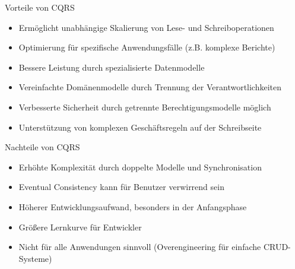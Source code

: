 \begin{concept}{Vorteile von CQRS}\\
    \begin{itemize}
        \item Ermöglicht unabhängige Skalierung von Lese- und Schreiboperationen
        \item Optimierung für spezifische Anwendungsfälle (z.B. komplexe Berichte)
        \item Bessere Leistung durch spezialisierte Datenmodelle
        \item Vereinfachte Domänenmodelle durch Trennung der Verantwortlichkeiten
        \item Verbesserte Sicherheit durch getrennte Berechtigungsmodelle möglich
        \item Unterstützung von komplexen Geschäftsregeln auf der Schreibseite
    \end{itemize}
\end{concept}

\begin{concept}{Nachteile von CQRS}\\
    \begin{itemize}
        \item Erhöhte Komplexität durch doppelte Modelle und Synchronisation
        \item Eventual Consistency kann für Benutzer verwirrend sein
        \item Höherer Entwicklungsaufwand, besonders in der Anfangsphase
        \item Größere Lernkurve für Entwickler
        \item Nicht für alle Anwendungen sinnvoll (Overengineering für einfache CRUD-Systeme)
    \end{itemize}
\end{concept}

